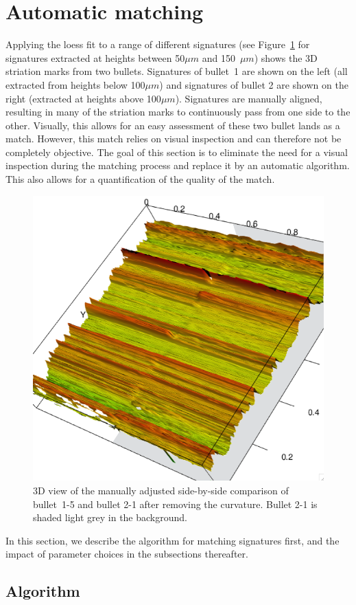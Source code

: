 \documentclass[aoas, preprint]{imsart}\usepackage[]{graphicx}\usepackage[]{color}
\begin{document}
\section{Automatic matching}
Applying the loess fit to a range of different signatures (see Figure~\ref{fig:manualmatch-rgl} for signatures extracted at heights between 50$\mu m$ and 150~$\mu m$) shows the 3D striation marks from two bullets. Signatures of bullet~1 are shown on the left (all extracted from heights below 100$\mu m$) and signatures of bullet 2 are shown on the right (extracted at heights above 100$\mu m$). Signatures are manually aligned, resulting in many of the striation marks to continuously pass from one side to the other. Visually, this allows for an easy assessment of these two bullet lands as a match. However, this match relies on visual inspection and can therefore not be completely objective.  The goal of this section is to eliminate the need for a visual inspection during the matching process and replace it by an automatic algorithm. This also allows for a quantification of the quality of the match.

\begin{figure}[hbtp]
\centering
\includegraphics[width=.65\columnwidth]{images/matchup-rgl-copy.png}
\caption{\label{fig:manualmatch-rgl}3D view of the manually adjusted side-by-side comparison of bullet~1-5 and bullet 2-1 after removing the curvature. Bullet 2-1 is shaded light grey in the background.}
\end{figure}

In this section, we describe the algorithm for matching signatures first, and the impact of parameter choices in the subsections thereafter.

\subsection{Algorithm}\label{sec:algorithm}
\end{document}
